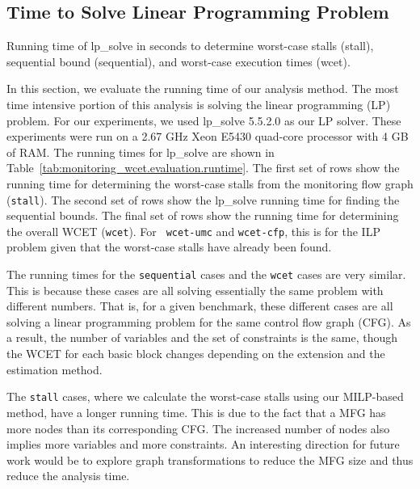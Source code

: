 \subsection{Time to Solve Linear Programming Problem}
\label{sec:monitoring_wcet.evaluation.lptime}

\begin{table}
  \begin{center}
    \begin{footnotesize}
    
    \end{footnotesize}
    \caption{Running time of lp\_solve in seconds to determine worst-case stalls
    (stall), sequential bound (sequential), and worst-case execution times (wcet).}
    \label{tab:monitoring_wcet.evaluation.runtime}
  \end{center}
\end{table}

In this section, we evaluate the running time of our analysis method.
The most time intensive portion of this analysis is solving 
the linear programming (LP) problem. For our experiments, we used lp\_solve
5.5.2.0 \cite{lpsolve} as our LP solver. These experiments were run on a 2.67
GHz Xeon E5430 quad-core processor with 4 GB of RAM. The running times for
lp\_solve are shown in Table~\ref{tab:monitoring_wcet.evaluation.runtime}.  The
first set of rows show the running time for determining the worst-case stalls
from the monitoring flow graph ({\tt stall}). The second set of rows show the
lp\_solve running time for finding the sequential bounds. The final set of rows
show the running time for determining the overall WCET ({\tt wcet}). For {\tt
wcet-umc} and {\tt wcet-cfp}, this is for the ILP problem given that the worst-case
stalls have already been found.

The running times for the {\tt sequential} cases and the {\tt wcet} cases are
very similar. This is because these cases are all solving essentially the same
problem with different numbers. That is, for a given benchmark, these different
cases are all solving a linear programming problem for the same control flow
graph (CFG). As a result, the number of variables and the set of constraints is
the same, though the WCET for each basic block changes depending on the
extension and the estimation method. 

The {\tt stall} cases, where we calculate the worst-case stalls using our
MILP-based method, have a longer running time. This is due to the fact that a
MFG has more nodes than its corresponding CFG. The increased number of nodes
also implies more variables and more constraints. An interesting direction for
future work would be to explore graph transformations to reduce the MFG size
and thus reduce the analysis time.

